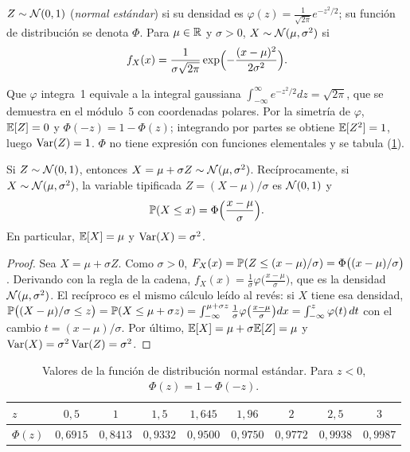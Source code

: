 \begin{definicion}[Normal]
$Z\sim\mathcal{N}(0,1)$ (\emph{normal estándar}) si su densidad es $\varphi(z)=\frac{1}{\sqrt{2\pi}}e^{-z^{2}/2}$; su función de distribución se denota $\Phi$. Para $\mu\in\mathbb{R}$ y $\sigma>0$, $X\sim\mathcal{N}(\mu,\sigma^{2})$ si
\[
f_X(x)=\frac{1}{\sigma\sqrt{2\pi}}\exp\Bigl(-\frac{(x-\mu)^{2}}{2\sigma^{2}}\Bigr).
\]
\end{definicion}

Que $\varphi$ integra~1 equivale a la integral gaussiana $\int_{-\infty}^{\infty}e^{-z^{2}/2}dz=\sqrt{2\pi}$, que se demuestra en el módulo~5 con coordenadas polares. Por la simetría de $\varphi$, $\mathbb{E}[Z]=0$ y $\Phi(-z)=1-\Phi(z)$; integrando por partes se obtiene $\mathbb{E}[Z^{2}]=1$, luego $\operatorname{Var}(Z)=1$. $\Phi$ no tiene expresión con funciones elementales y se tabula (\cref{tab:t6-phi}).

\begin{teorema}[Tipificación]\label{teo:t6-tipificacion}
Si $Z\sim\mathcal{N}(0,1)$, entonces $X=\mu+\sigma Z\sim\mathcal{N}(\mu,\sigma^{2})$. Recíprocamente, si $X\sim\mathcal{N}(\mu,\sigma^{2})$, la variable tipificada $Z=(X-\mu)/\sigma$ es $\mathcal{N}(0,1)$ y
\[
\mathbb{P}(X\le x)=\Phi\Bigl(\frac{x-\mu}{\sigma}\Bigr).
\]
En particular, $\mathbb{E}[X]=\mu$ y $\operatorname{Var}(X)=\sigma^{2}$.
\end{teorema}

\begin{proof}
Sea $X=\mu+\sigma Z$. Como $\sigma>0$, $F_X(x)=\mathbb{P}(Z\le(x-\mu)/\sigma)=\Phi\bigl((x-\mu)/\sigma\bigr)$. Derivando con la regla de la cadena, $f_X(x)=\frac1\sigma\varphi\bigl(\frac{x-\mu}\sigma\bigr)$, que es la densidad $\mathcal{N}(\mu,\sigma^{2})$. El recíproco es el mismo cálculo leído al revés: si $X$ tiene esa densidad, $\mathbb{P}\bigl((X-\mu)/\sigma\le z\bigr)=\mathbb{P}(X\le\mu+\sigma z)=\int_{-\infty}^{\mu+\sigma z}\frac1\sigma\varphi\bigl(\frac{x-\mu}\sigma\bigr)dx=\int_{-\infty}^{z}\varphi(t)\,dt$ con el cambio $t=(x-\mu)/\sigma$. Por último, $\mathbb{E}[X]=\mu+\sigma\mathbb{E}[Z]=\mu$ y $\operatorname{Var}(X)=\sigma^{2}\operatorname{Var}(Z)=\sigma^{2}$.
\end{proof}

\begin{table}[h]
\centering
\begin{tabular}{@{}lcccccccc@{}}
\toprule
$z$ & $0{,}5$ & $1$ & $1{,}5$ & $1{,}645$ & $1{,}96$ & $2$ & $2{,}5$ & $3$ \\
\midrule
$\Phi(z)$ & $0{,}6915$ & $0{,}8413$ & $0{,}9332$ & $0{,}9500$ & $0{,}9750$ & $0{,}9772$ & $0{,}9938$ & $0{,}9987$ \\
\bottomrule
\end{tabular}
\caption{Valores de la función de distribución normal estándar. Para $z<0$, $\Phi(z)=1-\Phi(-z)$.}
\label{tab:t6-phi}
\end{table}

